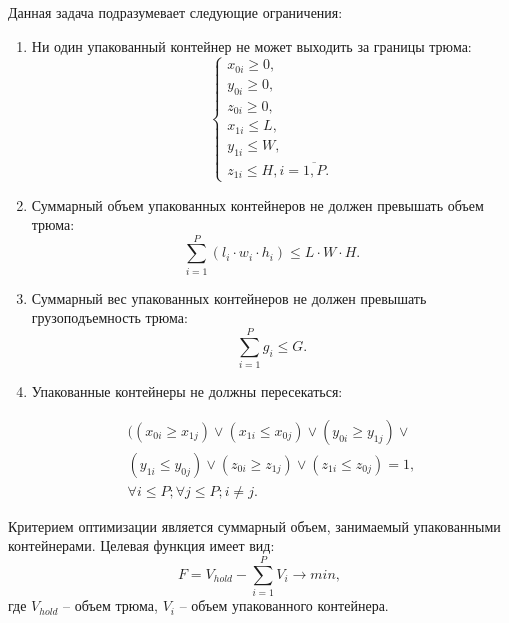 Данная задача подразумевает следующие ограничения:
\begin{enumerate}
	\item Ни один упакованный контейнер не может выходить за границы трюма:
    \begin{equation}
	\label{formula:volume}
    \begin{cases}
        x_{0i} \geq 0, \\
        y_{0i} \geq 0, \\
        z_{0i} \geq 0, \\
        x_{1i} \leq L, \\
        y_{1i} \leq W,\\
        z_{1i} \leq H, i = \overline {1, P}.
    \end{cases}
    \end{equation}
    
	\item Суммарный объем упакованных контейнеров не должен превышать объем трюма:
    \begin{equation}
	\label{formula:req_first}
    \sum_{i=1}^P (l_{i} \cdot w_{i} \cdot h_{i}) \leq L \cdot W \cdot H.
    \end{equation}

    \item Суммарный вес упакованных контейнеров не должен превышать грузоподъемность трюма:
    \begin{equation}
	\label{formula:req_first}
    \sum_{i=1}^P g_{i}  \leq G.
    \end{equation}
    
	\item Упакованные контейнеры не должны пересекаться:
    
    \begin{equation}
	\label{formula:req_third}
    \begin{array}{c}
    ((x_{0i} \geq x_{1j}) \vee (x_{1i} \leq x_{0j}) \vee (y_{0i} \geq y_{1j}) \vee \\
    (y_{1i} \leq y_{0j}) \vee (z_{0i} \geq z_{1j}) \vee (z_{1i} \leq z_{0j}) = 1, \\
    \forall i \leq P; \forall j \leq P; i \neq j.
    \end{array}
    \end{equation}

\end{enumerate}


Критерием оптимизации является суммарный объем, занимаемый упакованными контейнерами. Целевая функция имеет вид:
    \begin{equation}
	\label{formula:req_first}
    F = V_{hold} - \sum_{i=1}^P V_{i} \to min,
    \end{equation}
где $V_{hold}$ – объем трюма, $V_{i}$ – объем упакованного контейнера.

